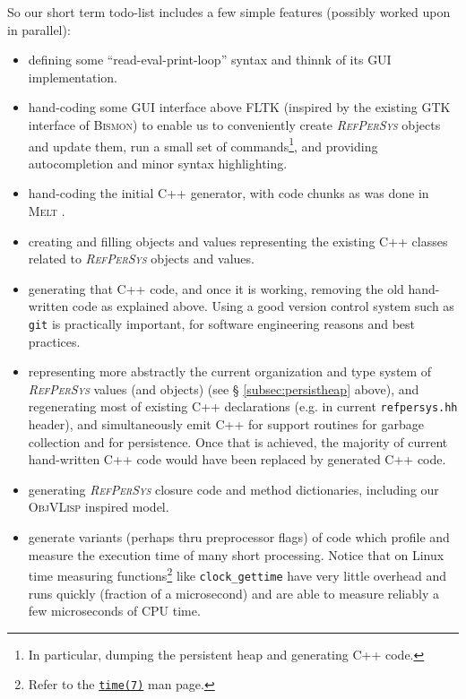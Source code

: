 \documentclass{IEEEtran}
\newcommand{\RefPerSys}{{\textit{\textsc{RefPerSys}}}}
\begin{document}
So our short term todo-list includes a few simple features (possibly
worked upon in parallel):

\begin{itemize}
  \item defining some ``read-eval-print-loop'' syntax and thinnk of
    its GUI implementation.
    
  \item hand-coding some GUI interface above FLTK (inspired by the
    existing GTK interface of \textsc{Bismon}) to enable us to
    conveniently create {\RefPerSys} objects and update them, run a
    small set of commands\footnote{In particular, dumping the
    persistent heap and generating C++ code.}, and providing
    autocompletion and minor syntax highlighting.

  \item hand-coding the initial C++ generator, with code chunks as was done in  \textsc{Melt} \cite{Starynkevitch-DSL2011}.

  \item creating and filling objects and values representing the existing C++ classes related to {\RefPerSys} objects and values.

    \item generating that C++ code, and once it is working, removing
      the old hand-written code as explained above. Using a good
      version control system such as \texttt{git} is practically
      important, for software engineering reasons and best practices.

      \item representing more abstractly the current organization and
        type system of {\RefPerSys} values (and objects) (see \S
        \ref{subsec:persistheap} above), and regenerating most of
        existing C++ declarations (e.g. in current
        \texttt{refpersys.hh} header), and simultaneously emit C++ for
        support routines for garbage collection and for
        persistence. Once that is achieved, the majority of current
        hand-written C++ code would have been replaced by generated
        C++ code.

      \item generating {\RefPerSys} closure code and method dictionaries, including our \textsc{ObjVLisp} inspired model.

        \item generate variants (perhaps thru preprocessor flags) of
          code which profile and measure the execution time of many
          short processing. Notice that on Linux time measuring
          functions\footnote{Refer to the
          \href{https://man7.org/linux/man-pages/man7/time.7.html}{\texttt{time(7)}}
          man page.} like \texttt{clock\_gettime} have very little
          overhead and runs quickly (fraction of a microsecond) and
          are able to measure reliably a few microseconds of CPU time.
\end{itemize}
\end{document}

